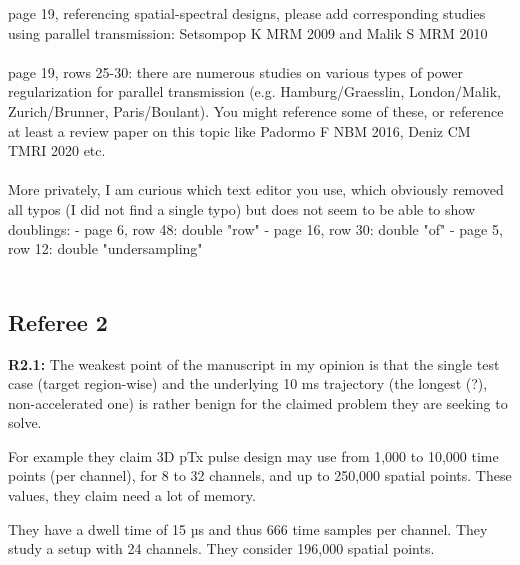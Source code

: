 \documentclass[11pt]{article}
\newcommand{\mysubsectionstar}[1]{\vspace{0mm}\subsection*{#1}\vspace{0mm}}
\begin{document}
 page 19, referencing spatial-spectral designs, please add corresponding studies using parallel transmission: Setsompop K MRM 2009 and Malik S MRM 2010
\\[0.2em]
\indent{\it \textcolor{blue}{We have added those citations, in both the Conclusion and Introduction.}}
\\[1.2em]

 page 19, rows 25-30: there are numerous studies on various types of power regularization for parallel transmission (e.g. Hamburg/Graesslin, London/Malik, Zurich/Brunner, Paris/Boulant). You might reference some of these, or reference at least a review paper on this topic like Padormo F NBM 2016, Deniz CM TMRI 2020 etc.
\\[0.2em]
\indent{\it \textcolor{blue}{We apologize; there were some references we intended to include there but missed in the initial submission.
In response to this and R2.2 and R2.3, we have added citations to the two review articles you mention, and also explicitly state that it is unclear at this time how and
whether hard constraints could be built in to the method.}}
\\[1.2em]

 More privately, I am curious which text editor you use, which obviously removed all typos (I did not find a single typo) but does not seem to be able to show doublings:
- page 6, row 48: double "row"
- page 16, row 30: double "of"
- page 5, row 12: double "undersampling"
\\[0.2em]
\indent{\it \textcolor{blue}{We used TexShop on the Mac - thanks for finding the doublings! 
We found and fixed the ``of'' and ``undersampling'' ones but could not locate the ``row'' one.}}
\\[1.2em]

\mysubsectionstar{Referee 2}
{\bf R2.1:} The weakest point of the manuscript in my opinion is that the single test case (target region-wise) and the underlying 10 ms trajectory (the longest (?), non-accelerated one) is rather benign for the claimed problem they are seeking to solve.

For example they claim 3D pTx pulse design may use from 1,000 to 10,000 time points (per channel), for 8 to 32 channels, and up to 250,000 spatial points. These values, they claim need a lot of memory.

They have a dwell time of 15 µs and thus 666 time samples per channel.
They study a setup with 24 channels.
They consider 196,000 spatial points.
\end{document}
